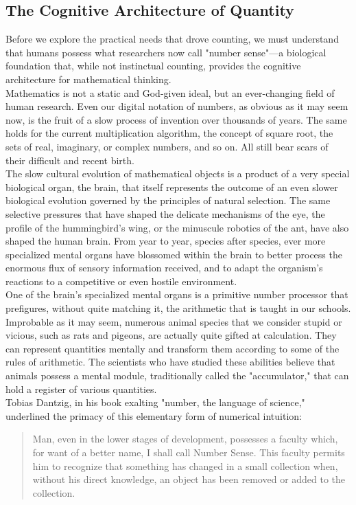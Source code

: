 \subsection{The Cognitive Architecture of Quantity}
Before we explore the practical needs that drove counting, we must understand that humans possess what researchers now call "number sense"—a biological foundation that, while not instinctual counting, provides the cognitive architecture for mathematical thinking.\\
Mathematics is not a static and God-given ideal, but an ever-changing field of human research. Even our digital notation of numbers, as obvious as it may seem now, is the fruit of a slow process of invention over thousands of years. The same holds for the current multiplication algorithm, the concept of square root, the sets of real, imaginary, or complex numbers, and so on. All still bear scars of their difficult and recent birth.\\
The slow cultural evolution of mathematical objects is a product of a very special biological organ, the brain, that itself represents the outcome of an even slower biological evolution governed by the principles of natural selection. The same selective pressures that have shaped the delicate mechanisms of the eye, the profile of the hummingbird's wing, or the minuscule robotics of the ant, have also shaped the human brain. From year to year, species after species, ever more specialized mental organs have blossomed within the brain to better process the enormous flux of sensory information received, and to adapt the organism's reactions to a competitive or even hostile environment.\\ 
One of the brain's specialized mental organs is a primitive number processor that prefigures, without quite matching it, the arithmetic that is taught in our schools. Improbable as it may seem, numerous animal species that we consider stupid or vicious, such as rats and pigeons, are actually quite gifted at calculation. They can represent quantities mentally and transform them according to some of the rules of arithmetic. The scientists who have studied these abilities believe that animals possess a mental module, traditionally called the "accumulator," that can hold a register of various quantities.\\
Tobias Dantzig, in his book exalting "number, the language of science," underlined the primacy of this elementary form of numerical intuition:
\begin{quote}
	Man, even in the lower stages of development, possesses a faculty which, for want of a better name, I shall call Number Sense. This faculty permits him to recognize that something has changed in a small collection when, without his direct knowledge, an object has been removed or added to the collection.
\end{quote}
